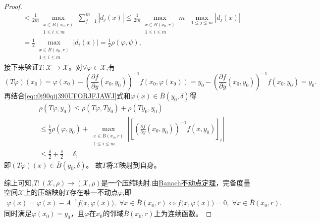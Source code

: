 \documentclass[../../main.tex]{subfiles}%
\begin{document}
\begin{proof}
\begin{align}
&<\frac{1}{2m}\max_{\substack{x \in \overline{B}(x_0, r) \\ 1 \leqslant i \leqslant m}}\sum_{j=1}^m{\left| d_j(x) \right|}\leqslant \frac{1}{2m}\max_{\substack{x \in \overline{B}(x_0, r) \\ 1 \leqslant i \leqslant m}}m\cdot \underset{1\leqslant j\leqslant m}{\max}\left| d_j(x) \right|
\nonumber \\
&= \frac{1}{2} \max_{\substack{x \in \overline{B}(x_0, r) \\ 1 \leqslant i \leqslant m}} |d_i(x)| = \frac{1}{2} \rho(\varphi, \psi),
\label{1.1.11}
\end{align}
接下来验证$T:\mathcal{X}\to\mathcal{X}$。对$\forall \varphi \in \mathcal{X}$,有
\[
(T\varphi)(x_0) = \varphi(x_0) - \left( \frac{\partial f}{\partial y}(x_0, y_0) \right)^{-1} f(x_0, \varphi(x_0)) = y_0 - \left( \frac{\partial f}{\partial y}(x_0, y_0) \right)^{-1} f(x_0, y_0) = y_0.
\]
再结合\eqref{eq::0j90qij390UFORJFJAWJ}式和$\varphi(x)\in \overline{B}(y_0,\delta)$得
\begin{align*}
&\rho(T\varphi, y_0) \leqslant \rho(T\varphi, T y_0) + \rho(T y_0, y_0) \\
&\leqslant \frac{1}{2} \rho(\varphi, y_0) + \max_{\substack{x \in \overline{B}(x_0, r) \\ 1 \leqslant i \leqslant m}} \left| \left[ \left( \frac{\partial f}{\partial y}(x_0, y_0) \right)^{-1} f(x, y_0) \right]_i \right|
\\
&\leqslant \frac{\delta}{2}+\frac{\delta}{2}=\delta,
\end{align*}
即$(T\varphi)(x)\in\overline{B}(y_0,\delta)$。
故$T$将$\mathcal{X}$映射到自身。

综上可知,$T:(\mathcal{X},\rho)\to (\mathcal{X},\rho)$是一个压缩映射.由\hyperref[theorem:Banach不动点定理——压缩映象原理]{Banach不动点定理}，完备度量空间$\mathcal{X}$上的压缩映射$T$存在唯一不动点$\varphi$,即
\begin{align*}
\varphi(x)=\varphi(x)-A^{-1}f\big(x,\varphi(x)\big),\,\,\forall x\in\overline{B}(x_0,r)\iff f\big(x,\varphi(x)\big)=0,\,\,\forall x\in\overline{B}(x_0,r).
\end{align*}
同时满足$\varphi(x_0)=y_0$，且$\varphi$在$x_0$的邻域$\overline{B}(x_0,r)$上为连续函数。


\end{proof}
\end{document}
